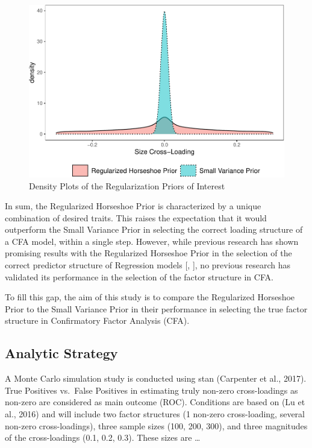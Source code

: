 \documentclass[
  english,
  man]{apa6}
\begin{document}
\begin{figure}
\centering
\includegraphics{JMBKoch_Proposal_files/figure-latex/unnamed-chunk-1-1.pdf}
\caption{\label{fig:unnamed-chunk-1}Density Plots of the Regularization Priors of Interest}
\end{figure}

In sum, the Regularized Horseshoe Prior is characterized by a unique combination of desired traits. This raises the expectation that it would outperform the Small Variance Prior in selecting the correct loading structure of a CFA model, within a single step. However, while previous research has shown promising results with the Regularized Horseshoe Prior in the selection of the correct predictor structure of Regression models {[}, {]}, no previous research has validated its performance in the selection of the factor structure in CFA.

To fill this gap, the aim of this study is to compare the Regularized Horseshoe Prior to the Small Variance Prior in their performance in selecting the true factor structure in Confirmatory Factor Analysis (CFA).

\hypertarget{analytic-strategy}{%
\subsection{Analytic Strategy}\label{analytic-strategy}}

A Monte Carlo simulation study is conducted using stan (Carpenter et al., 2017).
True Positives vs.~False Positives in estimating truly non-zero cross-loadings as non-zero are considered as main outcome (ROC).
Conditions are based on (Lu et al., 2016) and will include two factor structures (1 non-zero cross-loading, several non-zero cross-loadings), three sample sizes (100, 200, 300), and three magnitudes of the cross-loadings (0.1, 0.2, 0.3). These sizes are \ldots{}
\end{document}

